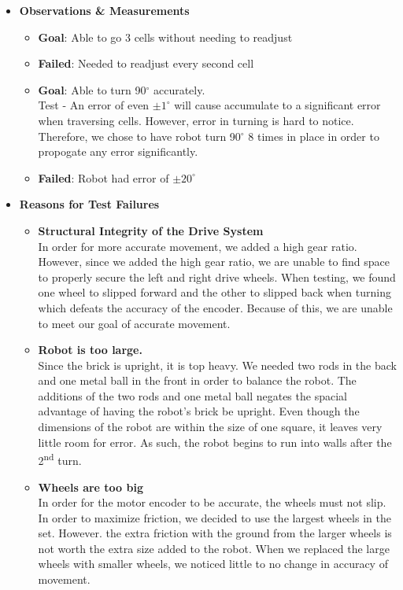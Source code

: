 \documentclass[11pt]{article}
\newcommand{\ts}{\textsuperscript}
\begin{document}
\begin{itemize}
\item \textbf{Observations \& Measurements}
	\begin{itemize}
	\item \textbf{Goal}: Able to go 3 cells without needing to readjust
	\item \textbf{Failed}: Needed to readjust every second cell
	\item \textbf{Goal}: Able to turn 90$^{\circ}$ accurately.\\
	Test - An error of even $ \pm 1^{\circ}$ will cause accumulate to a significant error when traversing cells. However, error in turning is hard to notice. Therefore, we chose to have robot turn 90$^{\circ}$ 8 times in place in order to propogate any error significantly.
	\item \textbf{Failed}: Robot had error of $ \pm 20^{\circ}$
	\end{itemize}
\item \textbf{Reasons for Test Failures}
	\begin{itemize}
	\item \textbf{Structural Integrity of the Drive System}\\
	In order for more accurate movement, we added a high gear ratio. However, since we added the high gear ratio, we are unable to find space to properly secure the left and right drive wheels. When testing, we found one wheel to slipped forward and the other to slipped back when turning which defeats the accuracy of the encoder. Because of this, we are unable to meet our goal of accurate movement.
	\item \textbf{Robot is too large.}\\
	Since the brick is upright, it is top heavy. We needed two rods in the back and one metal ball in the front in order to balance the robot. The additions of the two rods and one metal ball negates the spacial advantage of having the robot's brick be upright. Even though the dimensions of the robot are within the size of one square, it leaves very little room for error. As such, the robot begins to run into walls after the 2\ts{nd} turn.
	\item \textbf{Wheels are too big}\\
	In order for the motor encoder to be accurate, the wheels must not slip. In order to maximize friction, we decided to use the largest wheels in the set. However. the extra friction with the ground from the larger wheels is not worth the extra size added to the robot. When we replaced the large wheels with smaller wheels, we noticed little to no change in accuracy of movement.

\end{itemize}
\end{itemize}
\end{document}

